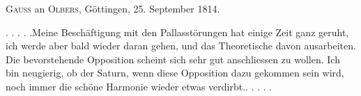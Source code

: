 \par{}\bigskip
\begin{center}
\textsc{Gauss} an \textsc{Olbers}, Göttingen, 25. September 1814.
\end{center}
\noindent\hspace*{\parindent}. . . . .\quad Meine Beschäftigung mit den Pallasstörungen hat einige Zeit ganz geruht, ich werde aber bald wieder daran gehen, und das Theoretische davon ausarbeiten. Die bevorstehende Opposition scheint sich sehr gut anschliessen zu wollen. Ich bin neugierig, ob der Saturn, wenn diese Opposition dazu gekommen sein wird, noch immer die schöne Harmonie wieder etwas verdirbt.\quad . . . . .
\par
